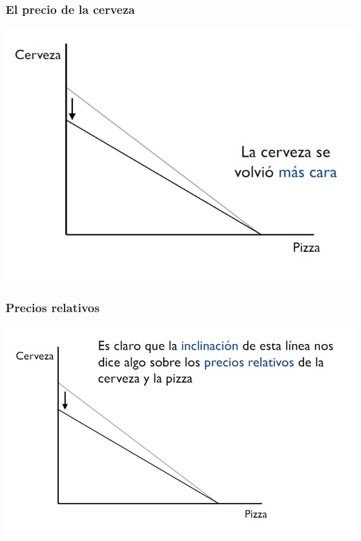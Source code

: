 \documentclass{beamer}
\begin{document}
\begin{frame}
\frametitle{El precio de la cerveza}
\centering
\includegraphics[scale=0.6]{Slides Principios de Economia/Figures/Tema_02.7_rp5.jpg}
\end{frame}

\begin{frame}
\frametitle{Precios relativos}
\centering
\includegraphics[scale=0.55]{Slides Principios de Economia/Figures/Tema_02.8_rp6.jpg}
\end{frame}
\end{document}
